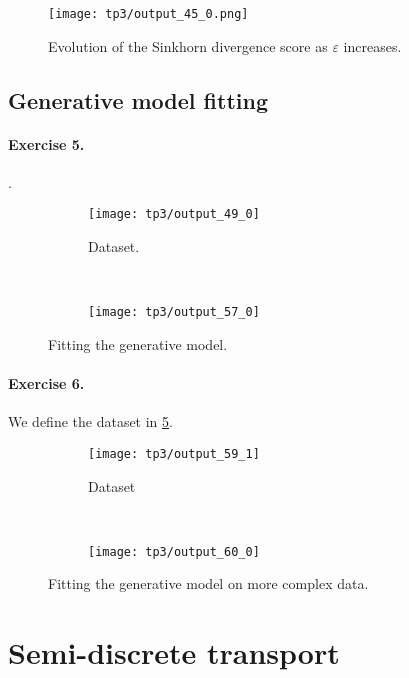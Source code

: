 \documentclass{article}
\renewcommand{\epsilon}{\varepsilon}
\numberwithin{equation}{section}
\theoremstyle{definition}
\begin{document}
\begin{figure}[!h]
	\centering
	\texttt{[image: tp3/output\_45\_0.png]}
	\caption{Evolution of the Sinkhorn divergence score as $\epsilon$ increases.}\label{fig:SinkhornDivgEpsilonObj}
\end{figure}



\subsection{Generative model fitting}


\paragraph{Exercise 5.} .
\begin{figure}[!h]
	\begin{subfigure}{.49\linewidth}
		\centering
		\texttt{[image: tp3/output\_49\_0]}
		\caption{Dataset.}
		\label{fig:output490}	
	\end{subfigure}~
	\begin{subfigure}{.49\linewidth}
		\centering
		\texttt{[image: tp3/output\_57\_0]}
		\caption{}
		\label{fig:output570}
	\end{subfigure}
	\caption{Fitting the generative model.}\label{fig:GenerativeFitting}
\end{figure}


\paragraph{Exercise 6.} We define the dataset in \cref{fig:output591}.
\begin{figure}
	\begin{subfigure}{.49\linewidth}
		\centering
		\texttt{[image: tp3/output\_59\_1]}
		\caption{Dataset}
		\label{fig:output591}
	\end{subfigure}~
	\begin{subfigure}{.49\linewidth}
		\centering
		\texttt{[image: tp3/output\_60\_0]}
		\caption{}
		\label{fig:output600}
	\end{subfigure}
	\caption{Fitting the generative model on more complex data.}\label{fig:GenerativeFittingComplex}
\end{figure}


\clearpage

\section{Semi-discrete transport}
\end{document}
